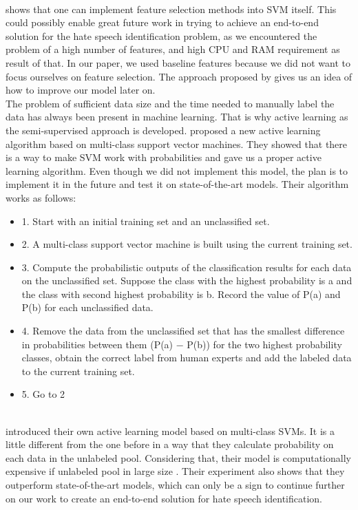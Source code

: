 \documentclass[10pt, a4paper]{article}
\begin{document}
	\\\citet{ChenSVMFeatures} shows that one can implement feature selection methods into SVM itself. This could possibly enable great future work in trying to achieve an end-to-end solution for the hate speech identification problem, as we encountered the problem of a high number of features, and high CPU and RAM requirement as result of that. In our paper, we used baseline features because we did not want to focus ourselves on feature selection. The approach proposed by \citet{ChenSVMFeatures} gives us an idea of how to improve our model later on.
	\\The problem of sufficient data size and the time needed to manually label the data has always been present in machine learning. That is why active learning as the semi-supervised approach is developed. \citet{LuoALPlankton} proposed a new active learning algorithm based on multi-class support vector machines. They showed that there is a way to make SVM work with probabilities and gave us a proper active learning algorithm. Even though we did not implement this model, the plan is to implement it in the future and test it on state-of-the-art models. Their algorithm works as follows:
	\begin{itemize}
		\item 1. Start with an initial training set and an unclassified set.
		\item 2. A multi-class support vector machine is built using the current training set.
		\item 3. Compute the probabilistic outputs of the classification results for each data on the unclassified set. Suppose the class with the highest probability is a and the class with second highest probability is b. Record the value of P(a) and P(b) for each unclassified data.
		\item 4. Remove the data from the unclassified set that has the smallest difference in probabilities between them (P(a) − P(b)) for the two highest probability classes, obtain the correct label from human experts and add the labeled data to the current training set.
		\item 5. Go to 2
	\end{itemize}
	\\\citet{YangMultiClassAL} introduced their own active learning model based on multi-class SVMs. It is a little different from the one before in a way that they calculate probability on each data in the unlabeled pool. Considering that, their model is computationally expensive if unlabeled pool in large size \citep{YangMultiClassAL}. Their experiment also shows that they outperform state-of-the-art models, which can only be a sign to continue further on our work to create an end-to-end solution for hate speech identification.
\end{document}
